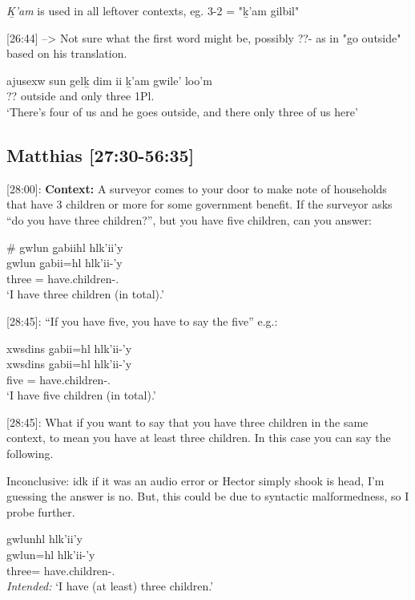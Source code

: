 \textit{Ḵ'am} is used in all leftover contexts, eg. 3-2 = "ḵ'am gilbil"

[26:44] --> Not sure what the first word might be, possibly ??- as in "go outside" based on his translation.
\begin{exe}
\ex \gll ajusexw sun gelḵ dim ii ḵ'am gwile' loo'm\\
?? \Demprox{} outside \Fut{} and only three 1Pl.\Prep{}\\
`There's four of us and he goes outside, and there only three of us here'
\end{exe}

\subsection{Matthias [27:30-56:35]}

[28:00]: \textbf{Context:}  A surveyor comes to your door to make note of households that have 3 children or more for some government benefit. If the surveyor asks ``do you have three children?'', but you have five children, can you answer:

\begin{exe}
    \ex \glll \# gwlun g̱abiihl hlk'ii'y \\
    {} gwlun g̱abii=hl hlk'ii-'y \\
    {} three \Cnt{}=\Cn{} have.children-\Fsg{}.\Ii{} \\
    `I have three children (in total).'
\end{exe}

[28:45]: ``If you have five, you have to say the five'' e.g.:

\begin{exe}
    \ex \glll xwsdins g̱abii=hl hlk'ii-'y \\
    xwsdins g̱abii=hl hlk'ii-'y \\
    five \Cnt{}=\Cn{} have.children-\Fsg{}.\Ii{} \\
    `I have five children (in total).'
\end{exe}

[28:45]: What if you want to say that you have three children in the same context, to mean you have at least three children. In this case you can say the following. 

Inconclusive: idk if it was an audio error or Hector simply shook is head, I'm guessing the answer is no. But, this could be due to syntactic malformedness, so I probe further.

\begin{exe}
    \ex \glll * gwlunhl hlk'ii'y \\
    {} gwlun=hl hlk'ii-'y \\
    {} three=\Cn{} have.children-\Fsg{}.\Ii{} \\
    \textit{Intended: }`I have (at least) three children.'
\end{exe}

